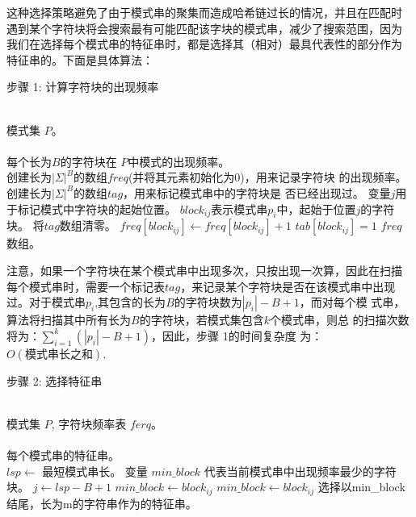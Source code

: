 这种选择策略避免了由于模式串的聚集而造成哈希链过长的情况，并且在匹配时
遇到某个字符块将会搜索最有可能匹配该字块的模式串，减少了搜索范围，因为
我们在选择每个模式串的特征串时，都是选择其（相对）最具代表性的部分作为
特征串的。下面是具体算法：

\begin{algorithm}
  \caption{步骤 1: 计算字符块的出现频率}
  \label{alg:block_freq}
  \begin{algorithmic}[1]
    \REQUIRE ~~\\
    模式集 $P$。 \\
    \ENSURE ~~\\
    每个长为$B$的字符块在 $P$中模式的出现频率。\\
    \STATE
    \STATE 创建长为$|\Sigma|^B$的数组$freq$(并将其元素初始化为0)，用来记录字符块
    的出现频率。
    \STATE 创建长为$|\Sigma|^B$的数组$tag$，用来标记模式串中的字符块是
    否已经出现过。
    \STATE 变量$j$用于标记模式中字符块的起始位置。
    \STATE $block_{ij}$表示模式串$p_i$中，起始于位置$j$的字符块。
    \STATE 将$tag$数组清零。
    \STATE $freq[block_{ij}] \leftarrow freq[block_{ij}]+1$
    \STATE $tab[block_{ij}]=1$
    \ENDIF
    \ENDFOR
    \ENDFOR
    \STATE
    \RETURN $freq$ 数组。
  \end{algorithmic}
\end{algorithm}


注意，如果一个字符块在某个模式串中出现多次，只按出现一次算，因此在扫描
每个模式串时，需要一个标记表$tag$，来记录某个字符块是否在该模式串中出现
过。对于模式串$p_i$,其包含的长为$B$的字符块数为$|p_i|-B+1$，而对每个模
式串，算法将扫描其中所有长为$B$的字符块，若模式集包含$k$个模式串，则总
的扫描次数将为：$\sum_{i=1}^{k}(|p_i|-B+1)$，因此，步骤 1的时间复杂度
为：$O(模式串长之和)$.

\begin{algorithm}
  \caption{步骤 2: 选择特征串}
  \label{alg:choose_signature}
  \begin{algorithmic}[1]
    \REQUIRE ~~\\
    模式集 $P$, 字符块频率表 $ferq$。 \\
    \ENSURE ~~\\
    每个模式串的特征串。\\
    \STATE
    \STATE $lsp \leftarrow$ 最短模式串长。
    \STATE 变量 $min\_block$ 代表当前模式串中出现频率最少的字符块。
    \STATE 
    \STATE $j \leftarrow lsp-B+1$
    \STATE $min\_block \leftarrow block_{ij}$
    \STATE $min\_block \leftarrow block_{ij}$
    \STATE 选择以min\_block结尾，长为m的字符串作为的特征串。
    \ENDIF
    \ENDFOR
    \ENDFOR
  \end{algorithmic}
\end{algorithm}

